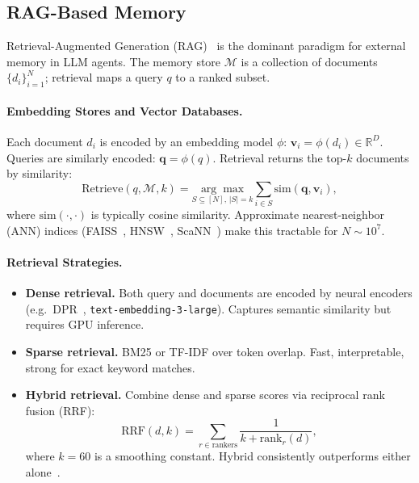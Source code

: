 \subsection{RAG-Based Memory}
\label{sec:rag-memory}

Retrieval-Augmented Generation (RAG)~\cite{lewis2020retrieval} is the dominant paradigm for external memory in LLM agents. The memory store $\mathcal{M}$ is a collection of documents $\{d_i\}_{i=1}^N$; retrieval maps a query $q$ to a ranked subset.

\paragraph{Embedding Stores and Vector Databases.}
\label{embedding-stores-and-vector-databases.}

Each document $d_i$ is encoded by an embedding model $\phi$: $\mathbf{v}_i = \phi(d_i) \in \mathbb{R}^{D}$. Queries are similarly encoded: $\mathbf{q} = \phi(q)$. Retrieval returns the top-$k$ documents by similarity: 
\[
\text{Retrieve}(q, \mathcal{M}, k) = \underset{S \subseteq [N],\, |S|=k}{\arg\max} \sum_{i \in S} \text{sim}(\mathbf{q}, \mathbf{v}_i),
\]
 where $\text{sim}(\cdot,\cdot)$ is typically cosine similarity. Approximate nearest-neighbor (ANN) indices (FAISS~\cite{johnson2019billion}, HNSW~\cite{malkov2018efficient}, ScaNN~\cite{guo2020scann}) make this tractable for $N \sim 10^7$.

\paragraph{Retrieval Strategies.}
\label{retrieval-strategies.}

\begin{itemize}
  \item \textbf{Dense retrieval.} Both query and documents are encoded by neural encoders (e.g.~DPR~\cite{karpukhin2020dense}, \texttt{text-embedding-3-large}). Captures semantic similarity but requires GPU inference.
  \item \textbf{Sparse retrieval.} BM25 or TF-IDF over token overlap. Fast, interpretable, strong for exact keyword matches.
  \item \textbf{Hybrid retrieval.} Combine dense and sparse scores via reciprocal rank fusion (RRF): 
\[
\text{RRF}(d, k) = \sum_{r \in \text{rankers}} \frac{1}{k + \text{rank}_r(d)},
\]
 where $k=60$ is a smoothing constant. Hybrid consistently outperforms either alone~\cite{chen2022hybrid}.
\end{itemize}

